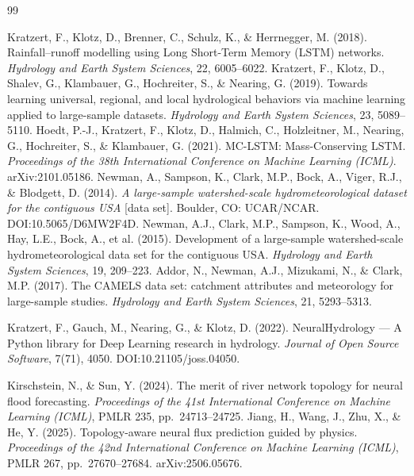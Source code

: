 \documentclass[11pt]{article}
\begin{document}
\begin{thebibliography}{99}

 Kratzert, F., Klotz, D., Brenner, C., Schulz, K., \& Herrnegger, M. (2018). Rainfall--runoff modelling using Long Short-Term Memory (LSTM) networks. \emph{Hydrology and Earth System Sciences}, 22, 6005--6022.
 Kratzert, F., Klotz, D., Shalev, G., Klambauer, G., Hochreiter, S., \& Nearing, G. (2019). Towards learning universal, regional, and local hydrological behaviors via machine learning applied to large-sample datasets. \emph{Hydrology and Earth System Sciences}, 23, 5089--5110.
 Hoedt, P.-J., Kratzert, F., Klotz, D., Halmich, C., Holzleitner, M., Nearing, G., Hochreiter, S., \& Klambauer, G. (2021). MC-LSTM: Mass-Conserving LSTM. \emph{Proceedings of the 38th International Conference on Machine Learning (ICML)}. arXiv:2101.05186. %
 Newman, A., Sampson, K., Clark, M.P., Bock, A., Viger, R.J., \& Blodgett, D. (2014). \emph{A large-sample watershed-scale hydrometeorological dataset for the contiguous USA} [data set]. Boulder, CO: UCAR/NCAR. DOI:10.5065/D6MW2F4D.
 Newman, A.J., Clark, M.P., Sampson, K., Wood, A., Hay, L.E., Bock, A., et al. (2015). Development of a large-sample watershed-scale hydrometeorological data set for the contiguous USA. \emph{Hydrology and Earth System Sciences}, 19, 209--223.
 Addor, N., Newman, A.J., Mizukami, N., \& Clark, M.P. (2017). The CAMELS data set: catchment attributes and meteorology for large-sample studies. \emph{Hydrology and Earth System Sciences}, 21, 5293--5313.

 Kratzert, F., Gauch, M., Nearing, G., \& Klotz, D. (2022). NeuralHydrology --- A Python library for Deep Learning research in hydrology. \emph{Journal of Open Source Software}, 7(71), 4050. DOI:10.21105/joss.04050.

 Kirschstein, N., \& Sun, Y. (2024). The merit of river network topology for neural flood forecasting. \emph{Proceedings of the 41st International Conference on Machine Learning (ICML)}, PMLR 235, pp.\ 24713--24725.
 Jiang, H., Wang, J., Zhu, X., \& He, Y. (2025). Topology-aware neural flux prediction guided by physics. \emph{Proceedings of the 42nd International Conference on Machine Learning (ICML)}, PMLR 267, pp.\ 27670--27684. arXiv:2506.05676.


\end{thebibliography}
\end{document}
